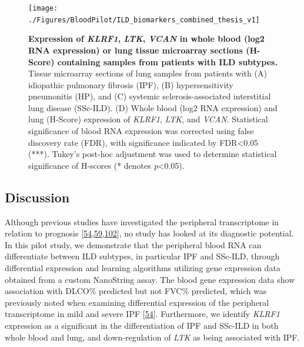 \documentclass[
]{article}
\begin{document}
\begin{figure}

{\centering \texttt{[image: ./Figures/BloodPilot/ILD\_biomarkers\_combined\_thesis\_v1]} 

}

\caption[Blood and Lung expression of LTK, KLRF1, VCAN]{\textbf{Expression of \textit{KLRF1}, \textit{LTK}, \textit{VCAN} in whole blood (log2 RNA expression) or lung tissue microarray sections (H-Score) containing samples from patients with ILD subtypes.} Tissue microarray sections of lung samples from patients with (A) idiopathic pulmonary fibrosis (IPF), (B) hypersensitivity pneumonitis (HP), and (C) systemic sclerosis-associated interstitial lung disease (SSc-ILD). (D) Whole blood (log2 RNA expression) and lung (H-Score) expression of \textit{KLRF1}, \textit{LTK}, and \textit{VCAN}. Statistical significance of blood RNA expression was corrected using false discovery rate (FDR), with significance indicated by FDR\textless0.05 (***). Tukey's post-hoc adjustment was used to determine statistical significance of H-scores (* denotes \textit{p}\textless0.05).}\label{fig:pilotexpr}
\end{figure}

\hypertarget{discussion-1}{%
\subsection{Discussion}\label{discussion-1}}

Although previous studies have investigated the peripheral transcriptome in relation to prognosis {[}\protect\hyperlink{ref-yang_peripheral_2012}{54},\protect\hyperlink{ref-herazo-maya_peripheral_2013}{59},\protect\hyperlink{ref-fernandez_perez_prognostic_2022}{102}{]}, no study has looked at its diagnostic potential. In this pilot study, we demonstrate that the peripheral blood RNA can differentiate between ILD subtypes, in particular IPF and SSc-ILD, through differential expression and learning algorithms utilizing gene expression data obtained from a custom NanoString assay. The blood gene expression data show association with DLCO\% predicted but not FVC\% predicted, which was previously noted when examining differential expression of the peripheral transcriptome in mild and severe IPF {[}\protect\hyperlink{ref-yang_peripheral_2012}{54}{]}. Furthermore, we identify \textit{KLRF1} expression as a significant in the differentiation of IPF and SSc-ILD in both whole blood and lung, and down-regulation of \textit{LTK} as being associated with IPF.
\end{document}
